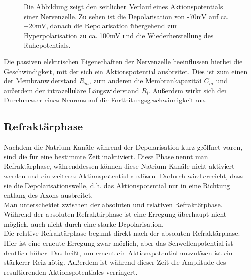 \documentclass[11pt]{article}
\begin{document}
\begin{figure}[H]
\caption{Die Abbildung zeigt den zeitlichen Verlauf eines Aktionspotentials einer Nervenzelle. Zu sehen ist die Depolarisation von -70mV auf ca. +20mV, danach die Repolarisation übergehend zur Hyperpolarisation zu ca. 100mV und die Wiederherstellung des Ruhepotentials.  }
\label{ap}
\end{figure}

Die passiven elektrischen Eigenschaften der Nervenzelle beeinflussen hierbei die Geschwindigkeit, mit der sich ein Aktionspotential ausbreitet. Dies ist zum einen der Membranwiderstand $R_m$, zum anderen die Membrankapazität $C_m$ und außerdem der intrazelluläre Längswiderstand $R_i$. Außerdem wirkt sich der Durchmesser eines Neurons auf die Fortleitungsgeschwindigkeit aus.  \cite{haustiere} 

\subsection{Refraktärphase}
Nachdem die Natrium-Kanäle während der Depolarisation kurz geöffnet waren, sind die für eine bestimmte Zeit inaktiviert. Diese Phase nennt man Refraktärphase, währenddessen können diese Natrium-Kanäle nicht aktiviert werden und ein weiteres Aktionspotential auslösen. Dadurch wird erreicht, dass sie die Depolarisationswelle, d.h. das Aktionspotential nur in eine Richtung entlang des Axons ausbreitet.  \cite{zellbiologie} \\
Man unterscheidet zwischen der absoluten und relativen Refraktärphase. Während der absoluten Refraktärphase ist eine Erregung überhaupt nicht möglich, auch nicht durch eine starke Depolarisation. \\
Die relative Refraktärphase beginnt direkt nach der absoluten Refraktärphase. Hier ist eine erneute Erregung zwar möglich, aber das Schwellenpotential ist deutlich höher. Das heißt, um erneut ein Aktionspotential auszulösen ist ein stärkerer Reiz nötig. Außerdem ist während dieser Zeit die Amplitude des resultierenden Aktionspotentiales verringert. \cite{physiologie}
\end{document}
